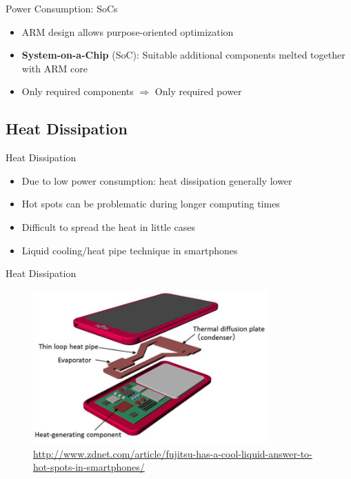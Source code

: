 \documentclass{beamer}
\begin{document}
\begin{frame}[t]{Power Consumption: SoCs}
    \begin{itemize}
        \item<1-> ARM design allows purpose-oriented optimization
        \item<2-> \textbf{System-on-a-Chip} (SoC): Suitable additional components melted together with ARM core 
        \item<2-> Only required components $\Rightarrow$ Only required power
    \end{itemize}
\end{frame}

\subsection{Heat Dissipation}
\begin{frame}[t]{Heat Dissipation}
  \begin{itemize}
   \item<1-3> Due to low power consumption: heat dissipation generally lower
   \item<2-3> Hot spots can be problematic during longer computing times
   \item<2-3> Difficult to spread the heat in little cases
   \item<3> Liquid cooling/heat pipe technique in smartphones
  \end{itemize}
\end{frame}

\begin{frame}{Heat Dissipation}
\begin{figure}
 \centering
    \includegraphics[width=0.8\textwidth]{cooling.jpg}
    \caption{\url{http://www.zdnet.com/article/fujitsu-has-a-cool-liquid-answer-to-hot-spots-in-smartphones/}}
\end{figure}
\end{frame}
\end{document}
